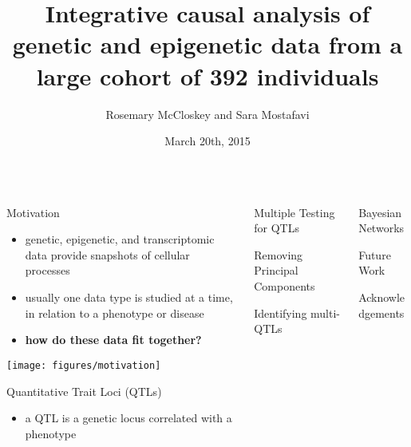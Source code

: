 \documentclass[final]{beamer}
\title{\huge Integrative causal analysis of genetic and epigenetic data from a
large cohort of 392 individuals}
\author{Rosemary McCloskey and Sara Mostafavi}
\institute[UBC]{University of British Columbia, Vancouver, Canada}
\date[March 20th, 2015]{March 20th, 2015}
\begin{document}
\begin{frame}
\begin{columns}

\begin{column}{0.33\textwidth}
\begin{block}{Motivation}
    \begin{itemize}
        \item genetic, epigenetic, and transcriptomic data provide snapshots of
            cellular processes
        \item usually one data type is studied at a time, in relation to a
            phenotype or disease
        \item \textbf{how do these data fit together?}
    \end{itemize}
    \begin{center}
        \texttt{[image: figures/motivation]}
    \end{center}
\end{block}

\begin{block}{Quantitative Trait Loci (QTLs)}
\begin{itemize}
    \item a QTL is a genetic locus correlated with a phenotype
\end{itemize}
\end{block}
\end{column}

\begin{column}{0.33\textwidth}
\begin{block}{Multiple Testing for QTLs}
\end{block}

\begin{block}{Removing Principal Components}
\end{block}

\begin{block}{Identifying multi-QTLs}
\end{block}
\end{column}

\begin{column}{0.33\textwidth}
\begin{block}{Bayesian Networks}
\end{block}

\begin{block}{Future Work}
\end{block}

\begin{block}{Acknowledgements}
\end{block}
\end{column}

\end{columns}
\end{frame}
\end{document}
